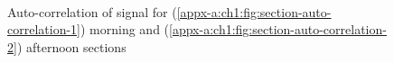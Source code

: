 \begin{figure}\centering
	\\
	\caption{Auto-correlation of signal for (\ref{appx-a:ch1:fig:section-auto-correlation-1}) morning and (\ref{appx-a:ch1:fig:section-auto-correlation-2}) afternoon sections}
	\label{appx-a:ch1:fig:section-auto-correlation}	
\end{figure}

